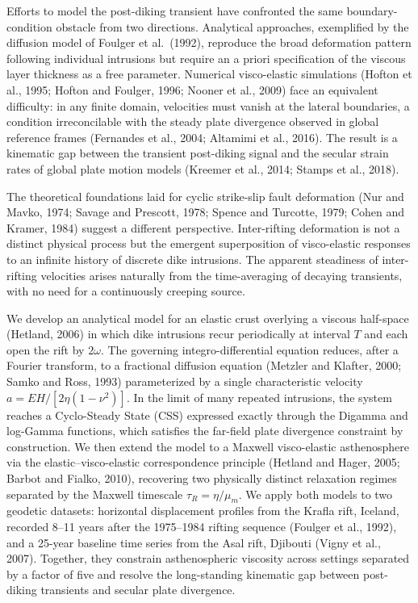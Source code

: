 \documentclass[12pt]{article}
\begin{document}
Efforts to model the post-diking transient have confronted the same
boundary-condition obstacle from two directions. Analytical approaches,
exemplified by the diffusion model of Foulger et al.\ (1992), reproduce the
broad deformation pattern following individual intrusions but require an
a priori specification of the viscous layer thickness as a free parameter. Numerical visco-elastic simulations (Hofton
et al., 1995; Hofton and Foulger, 1996; Nooner et al., 2009) face an
equivalent difficulty: in any finite domain, velocities must vanish at the
lateral boundaries, a condition irreconcilable with the steady plate
divergence observed in global reference frames (Fernandes et al., 2004;
Altamimi et al., 2016). The result is a kinematic gap between the
transient post-diking signal and the secular strain rates of global plate
motion models (Kreemer et al., 2014; Stamps et al., 2018).

The theoretical foundations laid for cyclic strike-slip fault deformation
(Nur and Mavko, 1974; Savage and Prescott, 1978; Spence and Turcotte, 1979;
Cohen and Kramer, 1984) suggest a different perspective. Inter-rifting
deformation is not a distinct physical process but the emergent
superposition of visco-elastic responses to an infinite history of discrete
dike intrusions. The apparent steadiness of inter-rifting velocities arises
naturally from the time-averaging of decaying transients, with no need for
a continuously creeping source.

We develop an analytical model for an elastic crust overlying a viscous
half-space (Hetland, 2006) in which dike intrusions recur periodically at
interval $T$ and each open the rift by $2\omega$. The governing
integro-differential equation reduces, after a Fourier transform, to a
fractional diffusion equation (Metzler and Klafter, 2000; Samko and Ross,
1993) parameterized by a single characteristic velocity
$a = EH/[2\eta(1-\nu^2)]$. In the limit of many repeated intrusions, the
system reaches a Cyclo-Steady State (CSS) expressed exactly through the
Digamma and log-Gamma functions, which satisfies the far-field plate
divergence constraint by construction. We then extend the model to a
Maxwell visco-elastic asthenosphere via the elastic--visco-elastic
correspondence principle (Hetland and Hager, 2005; Barbot and Fialko,
2010), recovering two physically distinct relaxation regimes separated by
the Maxwell timescale $\tau_R = \eta/\mu_m$. We apply both models to two
geodetic datasets: horizontal displacement profiles from the Krafla rift,
Iceland, recorded 8--11 years after the 1975--1984 rifting sequence
(Foulger et al., 1992), and a 25-year baseline time series from the
Asal rift, Djibouti (Vigny et al., 2007). Together, they constrain
asthenospheric viscosity across settings separated by a factor of five
and resolve the long-standing kinematic gap between post-diking transients
and secular plate divergence.
\end{document}
